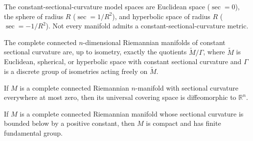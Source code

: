 The constant-sectional-curvature model spaces are Euclidean space ($\sec=0$), the sphere of radius
$R$ ($\sec=1/R^2$), and hyperbolic space of radius $R$ ($\sec=-1/R^2$). Not every manifold admits a
constant-sectional-curvature metric.

\begin{theorem}
\label{thm:characterization-constant-curvature}
\notready
The complete connected $n$-dimensional Riemannian manifolds of constant sectional curvature are,
up to isometry, exactly the quotients $\widetilde M/\Gamma$, where $\widetilde M$ is Euclidean,
spherical, or hyperbolic space with constant sectional curvature and $\Gamma$ is a discrete group of
isometries acting freely on $\widetilde M$.
\end{theorem}

\begin{theorem}
\label{thm:cartan-hadamard-preview}
\notready
If $M$ is a complete connected Riemannian $n$-manifold with sectional curvature everywhere at most
zero, then its universal covering space is diffeomorphic to $\mathbb R^n$.
\end{theorem}

\begin{theorem}[Myers]
\label{thm:myers}
\notready
If $M$ is a complete connected Riemannian manifold whose sectional curvature is bounded below by a
positive constant, then $M$ is compact and has finite fundamental group.
\end{theorem}

